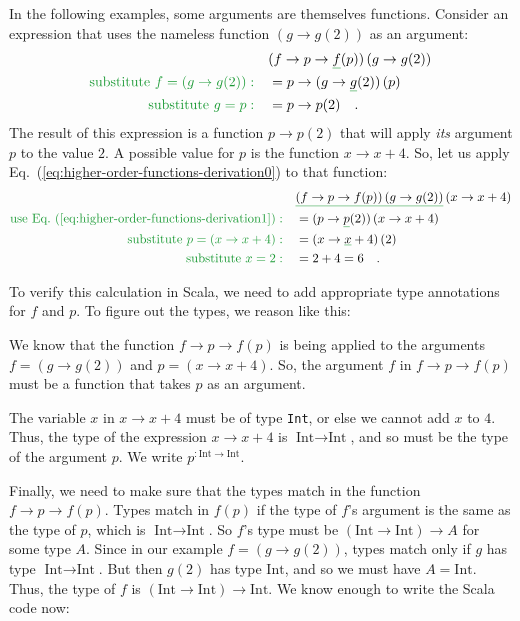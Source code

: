 In the following examples, some arguments are themselves functions.
Consider an expression that uses the nameless function $\left(g\rightarrow g(2)\right)$
as an argument:
\begin{align}
 & (f\rightarrow p\rightarrow\gunderline f(p))\left(g\rightarrow g(2)\right)\label{eq:higher-order-functions-derivation0}\\
{\color{greenunder}\text{substitute }f=\left(g\rightarrow g(2)\right):}\quad & =p\rightarrow(g\rightarrow\gunderline g(2))\,(p)\nonumber \\
{\color{greenunder}\text{substitute }g=p:}\quad & =p\rightarrow p(2)\quad.\label{eq:higher-order-functions-derivation1}
\end{align}
The result of this expression is a function $p\rightarrow p(2)$ that
will apply \emph{its} argument $p$ to the value $2$. A possible
value for $p$ is the function $x\rightarrow x+4$. So, let us apply
Eq.~(\ref{eq:higher-order-functions-derivation0}) to that function:
\begin{align*}
 & \gunderline{\left(f\rightarrow p\rightarrow f(p)\right)\left(g\rightarrow g(2)\right)}\left(x\rightarrow x+4\right)\\
{\color{greenunder}\text{use Eq.~(\ref{eq:higher-order-functions-derivation1})}:}\quad & =(p\rightarrow\gunderline p(2))\left(x\rightarrow x+4\right)\\
{\color{greenunder}\text{substitute }p=\left(x\rightarrow x+4\right):}\quad & =(x\rightarrow\gunderline x+4)\left(2\right)\\
{\color{greenunder}\text{substitute }x=2:}\quad & =2+4=6\quad.
\end{align*}

To verify this calculation in Scala, we need to add appropriate type
annotations for $f$ and $p$. To figure out the types, we reason
like this:

We know that the function $f\rightarrow p\rightarrow f(p)$ is being
applied to the arguments $f=\left(g\rightarrow g(2)\right)$ and $p=\left(x\rightarrow x+4\right)$.
So, the argument $f$ in $f\rightarrow p\rightarrow f(p)$ must be
a function that takes $p$ as an argument.

The variable $x$ in $x\rightarrow x+4$ must be of type \lstinline!Int!,
or else we cannot add $x$ to $4$. Thus, the type of the expression
$x\rightarrow x+4$ is $\text{Int}\rightarrow\text{Int}$, and so
must be the type of the argument $p$. We write $p^{:\text{Int}\rightarrow\text{Int}}$.

Finally, we need to make sure that the types match in the function
$f\rightarrow p\rightarrow f(p)$. Types match in $f(p)$ if the type
of $f$'s argument is the same as the type of $p$, which is $\text{Int}\rightarrow\text{Int}$.
So $f$'s type must be $\left(\text{Int}\rightarrow\text{Int}\right)\rightarrow A$
for some type $A$. Since in our example $f=\left(g\rightarrow g(2)\right)$,
types match only if $g$ has type $\text{Int}\rightarrow\text{Int}$.
But then $g(2)$ has type $\text{Int}$, and so we must have $A=\text{Int}$.
Thus, the type of $f$ is $\left(\text{Int}\rightarrow\text{Int}\right)\rightarrow\text{Int}$.
We know enough to write the Scala code now:

